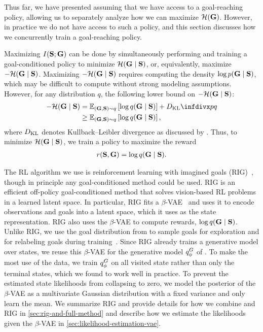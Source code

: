 Thus far, we have presented \METHOD assuming that we have access to a goal-reaching policy, allowing us to separately analyze how we can maximize ${\mathcal{H}}(\mathbf{G})$.
However, in practice we do not have access to such a policy, and this section discusses how we concurrently train a goal-reaching policy.

Maximizing $I({\mathbf{S}}; \mathbf{G})$ can be done by simultaneously performing \METHOD and training a goal-conditioned policy to minimize ${\mathcal{H}}(\mathbf{G} \mid {\mathbf{S}})$, or, equivalently, maximize $-{\mathcal{H}}(\mathbf{G} \mid {\mathbf{S}})$.
Maximizing $-{\mathcal{H}}(\mathbf{G} \mid {\mathbf{S}})$ requires computing the density $\log p(\mathbf{G} \mid {\mathbf{S}})$, which may be difficult to compute without strong modeling assumptions.
However, for any distribution $q$, the following lower bound on $-{\mathcal{H}}(\mathbf{G} \mid {\mathbf{S}})$:
\begin{align}\nonumber
-\HGS
    &= \E_{(\G, \SF) \sim q}\left[
        \log q(\G \mid \SF)
    \right]
+ \kld{p}{q}
\\\nonumber
&
    \geq \E_{(\G, \SF) \sim q}\left[
        \log q(\G \mid \SF)
    \right],
\end{align}
where $D_{\mathrm{KL}}$ denotes Kullback–Leibler divergence as discussed by \citet{barber2004information}.
Thus, to minimize ${\mathcal{H}}(\mathbf{G} \mid {\mathbf{S}})$, we train a policy to maximize the reward
\begin{align}\nonumber
    r({\mathbf{S}}, \mathbf{G}) = \log q(\mathbf{G} \mid {\mathbf{S}}).
\end{align}

The RL algorithm we use is reinforcement learning with imagined goals (RIG)~\citep{nair2018rig}, though in principle any goal-conditioned method could be used.
RIG is an efficient off-policy goal-conditioned method that solves vision-based RL problems in a learned latent space.
In particular, RIG fits a $\beta$-VAE~\citep{higgins2016beta} and uses it to encode observations and goals into a latent space, which it uses as the state representation.
RIG also uses the $\beta$-VAE to compute rewards, $\log q(\mathbf{G} \mid {\mathbf{S}})$.
Unlike RIG, we use the goal distribution from \METHOD to sample goals for exploration and for relabeling goals during training~\citep{andrychowicz2017her}.
Since RIG already trains a generative model over states, we reuse this $\beta$-VAE for the generative model ${q^G_{{\phi}}}$ of \METHOD.
To make the most use of the data, we train ${q^G_{{\phi}}}$ on all visited state rather than only the terminal states, which we found to work well in practice.
To prevent the estimated state likelihoods from collapsing to zero, we model the posterior of the $\beta$-VAE as a multivariate Gaussian distribution with a fixed variance and only learn the mean.
We summarize RIG and provide details for how we combine \METHOD and RIG in \autoref{sec:rig-and-full-method} and describe how we estimate the likelihoods given the $\beta$-VAE in \autoref{sec:likelihood-estimation-vae}.
